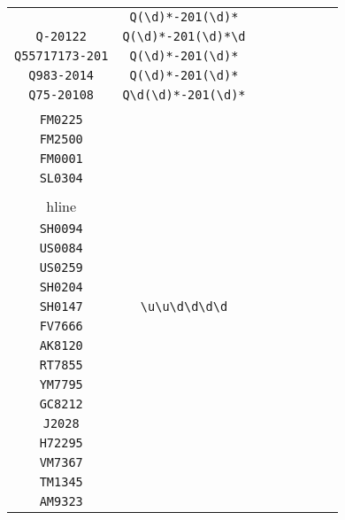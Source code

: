 \begin{longtable}{cccccccc}
\begin{tabular}{ll}
    \verb|Q407-201| & \verb|Q(\d)*-201(\d)*|\\
\verb|Q-20122| & \verb|Q(\d)*-201(\d)*\d|\\
\verb|Q55717173-201| & \verb|Q(\d)*-201(\d)*|\\
\verb|Q983-2014| & \verb|Q(\d)*-201(\d)*|\\
\verb|Q75-20108| & \verb|Q\d(\d)*-201(\d)*|
\end{tabular}
\\\midrule 
\begin{tabular}{l}
    \verb|SS0339|\\
\verb|FM0225|\\
\verb|FM2500|\\
\verb|FM0001|\\
\verb|SL0304|\\
\\hline\\
\verb|SH0094|\\
\verb|US0084|\\
\verb|US0259|\\
\verb|SH0204|\\
\verb|SH0147|
\end{tabular}

&
\verb|\u\u\d\d\d\d|
&

\begin{tabular}{l}
    \verb|\u\u\d\d\d\d|\\
\verb|FV7666|\\
\verb|AK8120|\\
\verb|RT7855|\\
\verb|YM7795|\\
\verb|GC8212|
\end{tabular}

&

\begin{tabular}{l}
    \verb.\u((\u)*(\d)*)|(M)\d\d\d\d.\\
\verb|J2028|\\
\verb|H72295|\\
\verb|VM7367|\\
\verb|TM1345|\\
\verb|AM9323|
\end{tabular}

&


\end{longtable}
